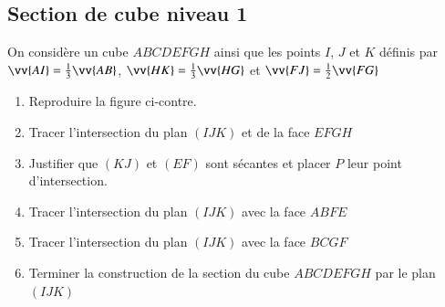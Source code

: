 \documentclass[oneside,12pt]{article}          %
\begin{document}
\subsection{Section de cube niveau 1}
\begin{minipage}{0.3\linewidth}
\end{minipage}\hfill
\begin{minipage}{0.65\linewidth}
On considère un cube $ABCDEFGH$ ainsi que les points $I$, $J$ et $K$ définis par $\vv{AI}=\frac{1}{3}\vv{AB}$, $\vv{HK}=\frac{1}{3}\vv{HG}$ et $\vv{FJ}=\frac{1}{2}\vv{FG}$
\begin{enumerate}
	\item Reproduire la figure ci-contre.
	\item Tracer l'intersection du plan $(IJK)$ et de la face $EFGH$
	\item Justifier que $(KJ)$ et $(EF)$ sont sécantes et placer $P$ leur point d'intersection.
	\item Tracer l'intersection du plan $(IJK)$ avec la face $ABFE$
	\item Tracer l'intersection du plan $(IJK)$ avec la face $BCGF$
	\item Terminer la construction de la section du cube $ABCDEFGH$ par le plan $(IJK)$
\end{enumerate}

\end{minipage}
\end{document}
